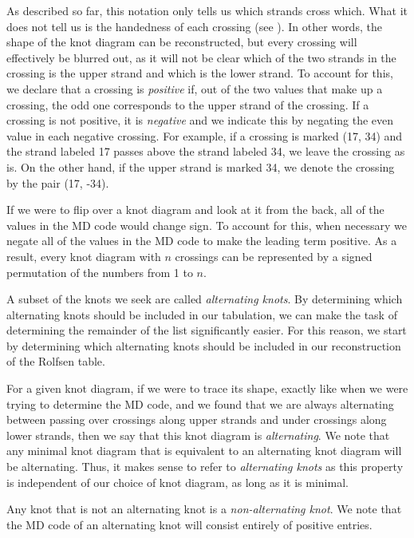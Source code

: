 \begin{paper}
As described so far, this notation only tells us which strands cross which.
What it does not tell us is the handedness of each crossing (see \figCrossings).
In other words, the shape of the knot diagram can be reconstructed, but every
crossing will effectively be blurred out, as it will not be clear which of the
two strands in the crossing is the upper strand and which is the lower strand.
To account for this, we declare that a crossing is \textit{positive} if, out of
the two values that make up a crossing, the odd one corresponds to the upper
strand of the crossing.
If a crossing is not positive, it is \textit{negative} and we indicate this by
negating the even value in each negative crossing.
For example, if a crossing is marked (17, 34) and the strand labeled 17 passes
above the strand labeled 34, we leave the crossing as is.
On the other hand, if the upper strand is marked 34, we denote the crossing by
the pair (17, -34).

If we were to flip over a knot diagram and look at it from the back, all of the
values in the MD code would change sign.
To account for this, when necessary we negate all of the values in the MD code
to make the leading term positive.
As a result, every knot diagram with $n$ crossings can be represented by a
signed permutation of the numbers from 1 to $n$.


A subset of the knots we seek are called \textit{alternating knots}.
By determining which alternating knots should be included in our tabulation, we
can make the task of determining the remainder of the list significantly easier.
For this reason, we start by determining which alternating knots should be
included in our reconstruction of the Rolfsen table.

For a given knot diagram, if we were to trace its shape, exactly like when we
were trying to determine the MD code, and we found that we are always
alternating between passing over crossings along upper strands and under 
crossings along lower strands, then we say that this knot diagram is
\textit{alternating}.
We note that any minimal knot diagram that is equivalent to an alternating knot
diagram will be alternating.
Thus, it makes sense to refer to \textit{alternating knots} as this property is
independent of our choice of knot diagram, as long as it is minimal.

Any knot that is not an alternating knot is a \textit{non-alternating knot}.
We note that the MD code of an alternating knot will consist entirely of
positive entries.


\end{paper}
